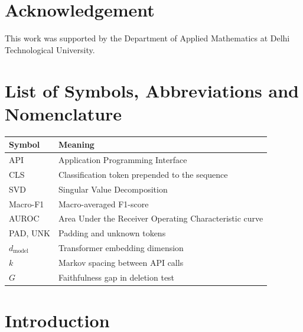 \documentclass[12pt]{report}
\begin{document}
\chapter*{Acknowledgement}

This work was supported by the Department of Applied Mathematics at Delhi Technological University.

\tableofcontents
\clearpage

\listoftables
{}
\clearpage

\listoffigures
{}
\clearpage

\chapter*{List of Symbols, Abbreviations and Nomenclature}
\begin{tabular}{ll}
\toprule
\textbf{Symbol} & \textbf{Meaning} \\
\midrule
API & Application Programming Interface \\
CLS & Classification token prepended to the sequence \\
SVD & Singular Value Decomposition \\
Macro-F1 & Macro-averaged F1-score \\
AUROC & Area Under the Receiver Operating Characteristic curve \\
PAD, UNK & Padding and unknown tokens \\
$d_{\text{model}}$ & Transformer embedding dimension \\
$k$ & Markov spacing between API calls \\
$G$ & Faithfulness gap in deletion test \\
\bottomrule
\end{tabular}

\clearpage
{}

\chapter{Introduction}
\end{document}
